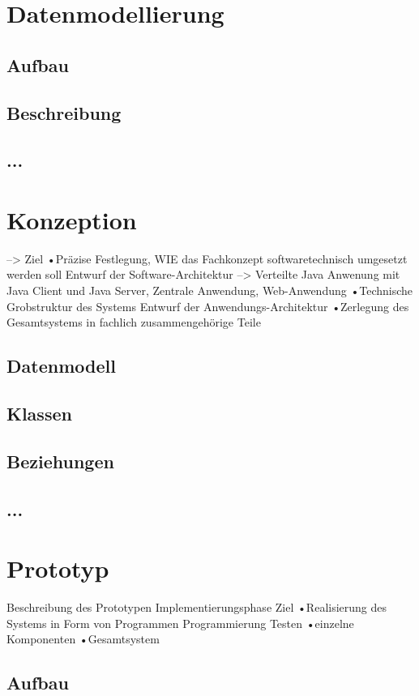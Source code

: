 \documentclass[12pt, titlepage]{article}
\begin{document}
\newpage
\section{Datenmodellierung}
\subsection{Aufbau}
\subsection{Beschreibung }
\subsection{...}

\newpage
\section{Konzeption}

--> Ziel
•Präzise Festlegung, WIE das Fachkonzept softwaretechnisch umgesetzt werden soll
Entwurf der Software-Architektur
--> Verteilte Java Anwenung mit Java Client und Java Server, Zentrale Anwendung, Web-Anwendung
•Technische Grobstruktur des Systems
Entwurf der Anwendungs-Architektur
•Zerlegung des Gesamtsystems in fachlich zusammengehörige Teile

\subsection{Datenmodell}
\subsection{Klassen}
\subsection{Beziehungen}
\subsection{...}

\newpage
\section{Prototyp}
Beschreibung des Prototypen
Implementierungsphase
Ziel
•Realisierung des Systems in Form von Programmen
Programmierung
Testen
•einzelne Komponenten
•Gesamtsystem

\subsection{Aufbau}
\end{document}
